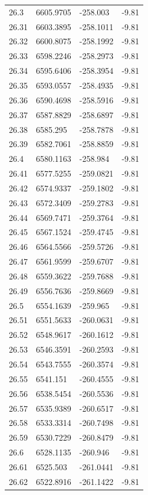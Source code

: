 \begin{table}[H]
\begin{tabular}{llll}
26.3 & 6605.9705 & -258.003 & -9.81 \\
26.31 & 6603.3895 & -258.1011 & -9.81 \\
26.32 & 6600.8075 & -258.1992 & -9.81 \\
26.33 & 6598.2246 & -258.2973 & -9.81 \\
26.34 & 6595.6406 & -258.3954 & -9.81 \\
26.35 & 6593.0557 & -258.4935 & -9.81 \\
26.36 & 6590.4698 & -258.5916 & -9.81 \\
26.37 & 6587.8829 & -258.6897 & -9.81 \\
26.38 & 6585.295 & -258.7878 & -9.81 \\
26.39 & 6582.7061 & -258.8859 & -9.81 \\
26.4 & 6580.1163 & -258.984 & -9.81 \\
26.41 & 6577.5255 & -259.0821 & -9.81 \\
26.42 & 6574.9337 & -259.1802 & -9.81 \\
26.43 & 6572.3409 & -259.2783 & -9.81 \\
26.44 & 6569.7471 & -259.3764 & -9.81 \\
26.45 & 6567.1524 & -259.4745 & -9.81 \\
26.46 & 6564.5566 & -259.5726 & -9.81 \\
26.47 & 6561.9599 & -259.6707 & -9.81 \\
26.48 & 6559.3622 & -259.7688 & -9.81 \\
26.49 & 6556.7636 & -259.8669 & -9.81 \\
26.5 & 6554.1639 & -259.965 & -9.81 \\
26.51 & 6551.5633 & -260.0631 & -9.81 \\
26.52 & 6548.9617 & -260.1612 & -9.81 \\
26.53 & 6546.3591 & -260.2593 & -9.81 \\
26.54 & 6543.7555 & -260.3574 & -9.81 \\
26.55 & 6541.151 & -260.4555 & -9.81 \\
26.56 & 6538.5454 & -260.5536 & -9.81 \\
26.57 & 6535.9389 & -260.6517 & -9.81 \\
26.58 & 6533.3314 & -260.7498 & -9.81 \\
26.59 & 6530.7229 & -260.8479 & -9.81 \\
26.6 & 6528.1135 & -260.946 & -9.81 \\
26.61 & 6525.503 & -261.0441 & -9.81 \\
26.62 & 6522.8916 & -261.1422 & -9.81 \\

\end{tabular}
\end{table}
